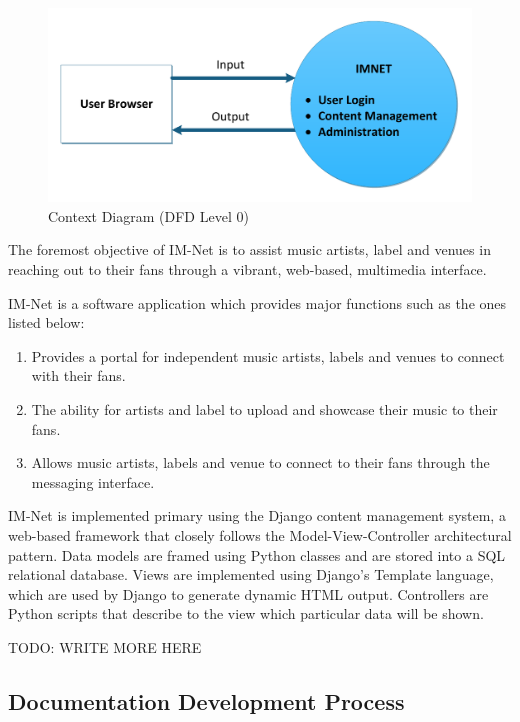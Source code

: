 \documentclass[letterpaper]{article}
\begin{document}
{%
\begin{figure}[h]
\centering
\includegraphics{DFD_level_0}
\caption{Context Diagram (DFD Level 0)}
\label{fig:DFD_level_0}
\end{figure}
\eject

The foremost objective of IM-Net is to assist music artists, label and venues in reaching out to their fans through a vibrant, web-based, multimedia interface.

IM-Net is a software application which provides major functions such as the ones listed below:

\begin{enumerate}
\item  Provides a portal for independent music artists, labels and venues to connect with their fans.

\item  The ability for artists and label to upload and showcase their music to their fans.

\item  Allows music artists, labels and venue to connect to their fans through the messaging interface.
\end{enumerate}

IM-Net is implemented primary using the Django content management system, a web-based framework that closely follows the Model-View-Controller architectural pattern. Data models are framed using Python classes and are stored into a SQL relational database. Views are implemented using Django's Template language, which are used by Django to generate dynamic HTML output. Controllers are Python scripts that describe to the view which particular data will be shown. 

TODO: WRITE MORE HERE

\textcolor{subsection}{\subsection{Documentation Development Process}}

}
\end{document}
